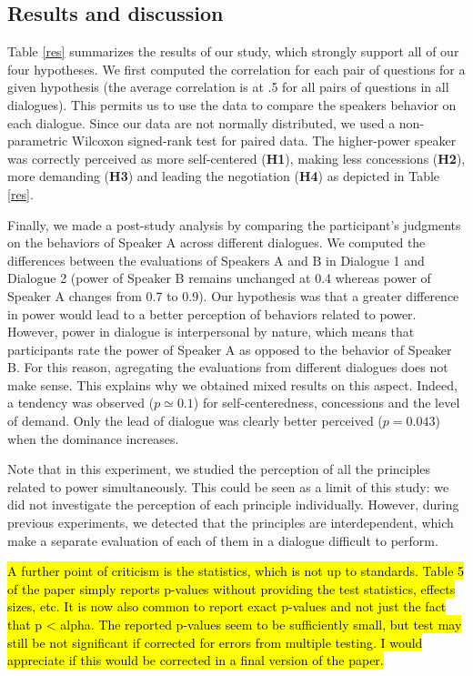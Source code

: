 \documentclass{llncs}
\begin{document}
			\subsection{Results and discussion}
			\vspace{-.5em} 
			Table  \ref{res} summarizes the results of our study, which strongly support all of our four hypotheses. We first computed the correlation for each pair of questions for a given hypothesis (the average correlation is at .5 for all pairs of questions in all dialogues). This permits us to use the data to compare the speakers behavior on each dialogue. Since our data are not normally distributed, we used a non-parametric Wilcoxon signed-rank test for paired data. The higher-power speaker was correctly perceived as more self-centered (\textbf{H1}), making less concessions (\textbf{H2}), more demanding (\textbf{H3}) and leading the negotiation (\textbf{H4}) as depicted in Table \ref{res}.
			
			Finally, we made a post-study analysis by comparing the participant's judgments on the behaviors of Speaker A across different dialogues. We computed the differences between the evaluations of Speakers A and B in Dialogue 1 and Dialogue 2 (power of Speaker B remains unchanged at 0.4 whereas power of Speaker A changes from 0.7 to 0.9). 
			Our hypothesis was that a greater difference in power would lead to a better perception of behaviors related to power. However, power in dialogue is interpersonal by nature, which means that participants rate the power of Speaker A as opposed to the behavior of Speaker B. For this reason, agregating the evaluations from different dialogues does not make sense. This explains why we obtained mixed results on this aspect. Indeed, a tendency was observed ($p\simeq 0.1$) for self-centeredness, concessions and the level of demand. Only the lead of dialogue was clearly better perceived ($p=0.043$) when the dominance increases.
			
			Note that in this experiment, we studied the perception of all the principles related to power simultaneously. This could be seen as a limit of this study: we did not investigate the perception of each principle individually. However, during previous experiments, we detected that the principles are interdependent, which make a separate evaluation of each of them in a dialogue difficult to perform.
			
			\hl{A further point of criticism is the statistics, which is not up to standards. Table 5 of the paper simply reports p-values without providing the test statistics, effects sizes, etc. It is now also common to report exact p-values and not just the fact that p < alpha. The reported p-values seem to be sufficiently small, but test may still be not significant if corrected for errors from multiple testing. I would appreciate if this would be corrected in a final version of the paper.}
			
\end{document}
